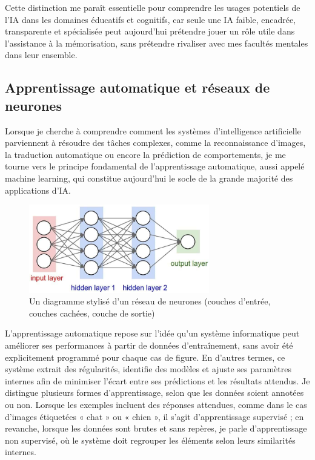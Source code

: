 \documentclass[11pt,a4paper]{report}
\begin{document}
Cette distinction me paraît essentielle pour comprendre les usages potentiels de l’IA dans les domaines éducatifs et cognitifs, car seule une IA faible, encadrée, transparente et spécialisée peut aujourd’hui prétendre jouer un rôle utile dans l’assistance à la mémorisation, sans prétendre rivaliser avec mes facultés mentales dans leur ensemble.

\subsection{Apprentissage automatique et réseaux de neurones}

Lorsque je cherche à comprendre comment les systèmes d’intelligence artificielle parviennent à résoudre des tâches complexes, comme la reconnaissance d’images, la traduction automatique ou encore la prédiction de comportements, je me tourne vers le principe fondamental de l’apprentissage automatique, aussi appelé machine learning, qui constitue aujourd’hui le socle de la grande majorité des applications d’IA.

\begin{figure}[h]
    \centering
    \includegraphics[width=0.7\textwidth]{images/2.1.3.png}
    \caption{Un diagramme stylisé d’un réseau de neurones (couches d’entrée, couches cachées, couche de sortie)}
    \label{fig:2.1.3}
\end{figure}

L’apprentissage automatique repose sur l’idée qu’un système informatique peut améliorer ses performances à partir de données d’entraînement, sans avoir été explicitement programmé pour chaque cas de figure. En d’autres termes, ce système extrait des régularités, identifie des modèles et ajuste ses paramètres internes afin de minimiser l’écart entre ses prédictions et les résultats attendus. Je distingue plusieurs formes d’apprentissage, selon que les données soient annotées ou non. Lorsque les exemples incluent des réponses attendues, comme dans le cas d’images étiquetées « chat » ou « chien », il s’agit d’apprentissage supervisé ; en revanche, lorsque les données sont brutes et sans repères, je parle d’apprentissage non supervisé, où le système doit regrouper les éléments selon leurs similarités internes.
\end{document}
